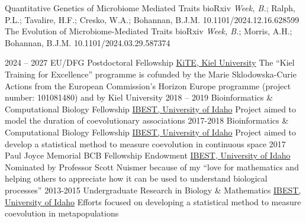 \documentclass[9pt]{developercv} %
\begin{document}
\vspace{-5 pt}
\begin{publist}
		{Quantitative Genetics of Microbiome Mediated Traits}
		{bioRxiv}
		{\emph{Week, B.}; Ralph, P.L.; Tavalire, H.F.; Cresko, W.A.; Bohannan, B.J.M.}
        {10.1101/2024.12.16.628599}
		{The Evolution of Microbiome-Mediated Traits}
		{bioRxiv}
		{\emph{Week, B.}; Morris, A.H.; Bohannan, B.J.M.}
        {10.1101/2024.03.29.587374}
\end{publist}


\vspace{-10 pt}
\begin{entrylist}
    \entry
        {2024 -- 2027}
        {EU/DFG Postdoctoral Fellowship}
        {\href{https://www.uni-kiel.de/en/research/early-career-researchers/kite}{KiTE, Kiel University}}
        {The “Kiel Training for Excellence” programme is cofunded by the Marie Sklodowska-Curie Actions from the European Commission's Horizon Europe programme (project number: 101081480) and by Kiel University}
    \entry
        {2018 -- 2019}
        {Bioinformatics \& Computational Biology Fellowship}
        {\href{https://www.iids.uidaho.edu/about.php}{IBEST, University of Idaho}}
        {Project aimed to model the duration of coevolutionary associations}
    \entry
        {2017-2018}
        {Bioinformatics \& Computational Biology Fellowship}
        {\href{https://www.iids.uidaho.edu/about.php}{IBEST, University of Idaho}}
        {Project aimed to develop a statistical method to measure coevolution in continuous space}
    \entry
        {2017}
        {Paul Joyce Memorial BCB Fellowship Endowment}
        {\href{https://www.iids.uidaho.edu/about.php}{IBEST, University of Idaho}}
        {Nominated by Professor Scott Nuismer because of my “love for mathematics and helping others to appreciate how it can be used to understand biological processes”}
    \entry
        {2013-2015}
        {Undergraduate Research in Biology \& Mathematics}
        {\href{https://www.iids.uidaho.edu/about.php}{IBEST, University of Idaho}}
        {Efforts focused on developing a statistical method to measure coevolution in metapopulations}
\end{entrylist}
\end{document}
